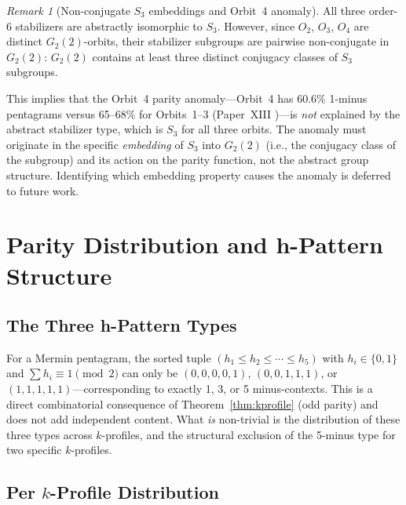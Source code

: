 \documentclass[11pt,a4paper]{article}
\theoremstyle{remark}
\newtheorem{remark}[theorem]{Remark}
\begin{document}
\begin{remark}[Non-conjugate $S_3$ embeddings and Orbit~4 anomaly]
\label{rem:nonconj}
All three order-6 stabilizers are abstractly isomorphic to $S_3$.
However, since $O_2$, $O_3$, $O_4$ are distinct $G_2(2)$-orbits, their
stabilizer subgroups are pairwise non-conjugate in $G_2(2)$: $G_2(2)$
contains at least three distinct conjugacy classes of $S_3$ subgroups.

This implies that the Orbit~4 parity anomaly---Orbit~4 has 60.6\% 1-minus
pentagrams versus 65--68\% for Orbits~1--3 (Paper~XIII \cite{PaperXIII})---is
\emph{not} explained by the abstract stabilizer type, which is $S_3$ for all
three orbits.
The anomaly must originate in the specific \emph{embedding} of $S_3$ into
$G_2(2)$ (i.e., the conjugacy class of the subgroup) and its action on the
parity function, not the abstract group structure.
Identifying which embedding property causes the anomaly is deferred to
future work.
\end{remark}


\section{Parity Distribution and h-Pattern Structure}\label{sec:hpattern}

\subsection{The Three h-Pattern Types}

For a Mermin pentagram, the sorted tuple $(h_1 \leq h_2 \leq \cdots \leq h_5)$
with $h_i \in \{0,1\}$ and $\sum h_i \equiv 1 \pmod 2$ can only be
$(0,0,0,0,1)$, $(0,0,1,1,1)$, or $(1,1,1,1,1)$---corresponding to exactly
1, 3, or 5 minus-contexts.
This is a direct combinatorial consequence of Theorem~\ref{thm:kprofile}
(odd parity) and does not add independent content.
What \emph{is} non-trivial is the distribution of these three types across
$k$-profiles, and the structural exclusion of the 5-minus type for two
specific $k$-profiles.

\subsection{\texorpdfstring{Per $k$-Profile Distribution}{Per k-Profile Distribution}}
\end{document}

